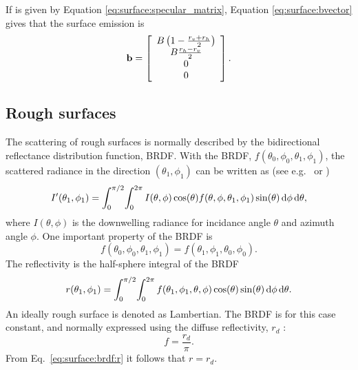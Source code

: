 If  is given by Equation \ref{eq:surface:specular_matrix},
Equation \ref{eq:surface:bvector} gives that the surface emission  is
\begin{equation}
  \label{eq:surface:specular_emission}
   \mathbf{b} = \left[\begin{array}{c}
     B\left(1-\frac{r_v+r_h}{2}\right) \\
     B\frac{r_h-r_v}{2} \\
     0\\0
   \end{array}\right].
\end{equation}


\subsection{Rough surfaces}
The scattering of rough surfaces is normally described by the bidirectional
reflectance distribution function, BRDF. With the BRDF,
$f(\theta_0,\phi_0,\theta_1,\phi_1)$, the scattered radiance in the
direction $(\theta_1,\phi_1)$ can be written as (see e.g.\ 
\citet{rees:01} or \citet{petty:06})
\begin{equation}
  \label{eq:surface:brdf1}
  I'(\theta_1,\phi_1) = \int_0^{\pi/2} \! \int_0^{2\pi} I(\theta,\phi) 
  \cos(\theta) f(\theta,\phi,\theta_1,\phi_1)
  \sin(\theta) \, \mathrm{d}\phi \, \mathrm{d}\theta,
\end{equation}
where $I(\theta,\phi)$ is the downwelling radiance for incidance angle $\theta$
and azimuth angle $\phi$. One important property of the BRDF is
\begin{equation}
  f(\theta_0,\phi_0,\theta_1,\phi_1) = f(\theta_1,\phi_1,\theta_0,\phi_0).
\end{equation}
The reflectivity is the half-sphere integral of the BRDF
\begin{equation}
  \label{eq:surface:brdf:r}
  r(\theta_1,\phi_1) = \int_0^{\pi/2} \! \int_0^{2\pi} 
  f(\theta_1,\phi_1,\theta,\phi) \cos(\theta)
  \sin(\theta) \, \mathrm{d}\phi \, \mathrm{d}\theta.
\end{equation}
An ideally rough surface is denoted as Lambertian. The BRDF is for this case
constant, and normally expressed using the diffuse reflectivity, $r_d$ 
 \citep[e.g.][]{petty:06}:
\begin{equation}
  \label{eq:surface:lambertian1}
  f = \frac{r_d}{\pi}.
\end{equation}
From Eq.~\ref{eq:surface:brdf:r} it follows that $r = r_d$.





  
